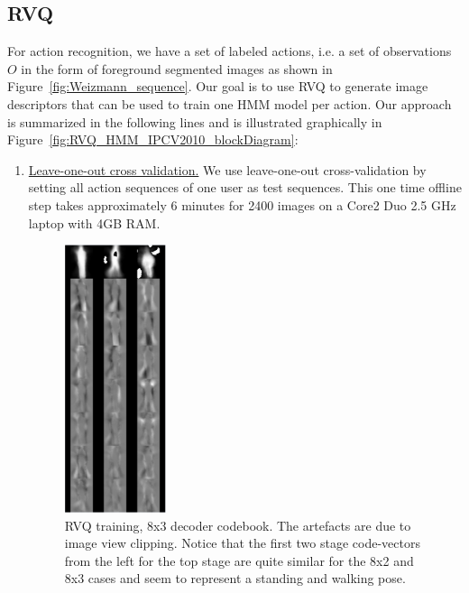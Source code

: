 \begin{Body}
\subsection{RVQ}
For action recognition, we have a set of labeled actions, i.e. a set of observations $O$ in the form of foreground segmented images as shown in Figure~\ref{fig:Weizmann_sequence}.  Our goal is to use RVQ to generate image descriptors that can be used to train one HMM model per action.  Our approach is summarized in the following lines and is illustrated graphically in Figure~\ref{fig:RVQ_HMM_IPCV2010_blockDiagram}:

\begin{enumerate}
\item \underline{Leave-one-out cross validation.}  We use leave-one-out cross-validation \cite{2000_JNL_SURVEYprml_Jain} by setting all action sequences of one user as test sequences.  This one time offline step takes approximately 6 minutes for 2400 images on a Core2 Duo 2.5 GHz laptop with 4GB RAM.

								\begin{figure}[t]	
								\centering
								\includegraphics[width=0.28\textwidth]{figs/Proposal_fig6a_RVQ_HMM_Weizmann_codebooks_8x3.png}
								\caption{RVQ training, 8x3 decoder codebook.  The artefacts are due to image view clipping.  Notice that the first two stage code-vectors from the left for the top stage are quite similar for the 8x2 and 8x3 cases and seem to represent a standing and walking pose.}
							\label{fig:8x3_codebook}
								\end{figure}


\end{enumerate}
\end{Body}
